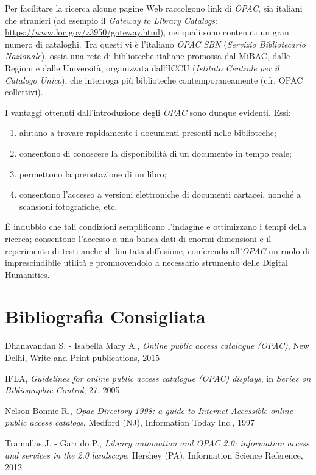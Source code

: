 {Per facilitare la ricerca alcune pagine Web raccolgono link di
\emph{OPAC}, sia italiani che stranieri (ad esempio il \emph{Gateway to
Library Catalogs}:
\url{https://www.loc.gov/z3950/gateway.html}),
nei quali sono contenuti un gran numero di cataloghi. Tra questi vi è
l'italiano \emph{OPAC SBN} (\emph{Servizio Bibliotecario Nazionale}),
ossia una rete di biblioteche italiane promossa dal MiBAC, dalle Regioni
e dalle Università, organizzata dall'ICCU (\emph{Istituto Centrale per
il Catalogo Unico}), che interroga più biblioteche contemporaneamente
(cfr. OPAC collettivi).

I vantaggi ottenuti dall'introduzione degli \emph{OPAC} sono dunque
evidenti. Essi:

\begin{enumerate}
\def\labelenumi{\arabic{enumi}.}
\item
  aiutano a trovare rapidamente i documenti presenti nelle biblioteche;
\item
  consentono di conoscere la disponibilità di un documento in tempo
  reale;
\item
  permettono la prenotazione di un libro;
\item
  consentono l'accesso a versioni elettroniche di documenti cartacei,
  nonché a scansioni fotografiche, etc.
\end{enumerate}

È indubbio che tali condizioni semplificano l'indagine e ottimizzano i
tempi della ricerca; consentono l'accesso a una banca dati di enormi
dimensioni e il reperimento di testi anche di limitata diffusione,
conferendo all'\emph{OPAC} un ruolo di imprescindibile utilità e
promuovendolo a necessario strumento delle Digital Humanities.

\section*{Bibliografia Consigliata}
{\parindent0pt 
Dhanavandan S. - Isabella Mary A., \emph{Online public access catalague
(OPAC)}, New Delhi, Write and Print publications, 2015

IFLA, \emph{Guidelines for online public access catalogue (OPAC)
displays}, in \emph{Series on Bibliographic Control}, 27, 2005

Nelson Bonnie R., \emph{Opac Directory 1998: a guide to
Internet-Accessible online public access catalogs}, Medford (NJ),
Information Today Inc., 1997

Tramullas J. - Garrido P., \emph{Library automation and OPAC 2.0:
information access and services in the 2.0 landscape}, Hershey (PA),
Information Science Reference, 2012
}

}

